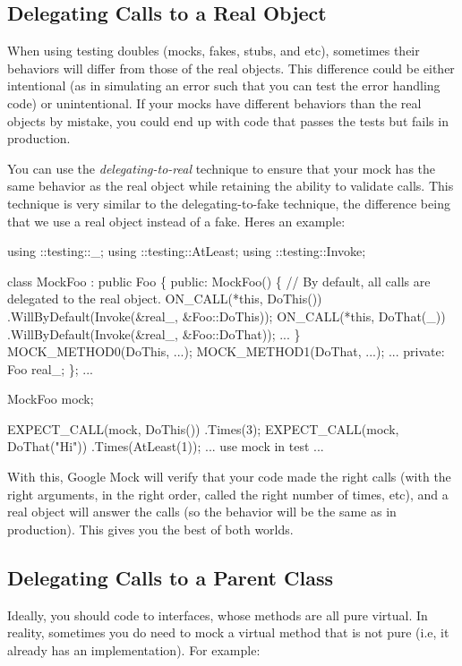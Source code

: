 \subsection*{Delegating Calls to a Real Object}

When using testing doubles (mocks, fakes, stubs, and etc), sometimes their behaviors will differ from those of the real objects. This difference could be either intentional (as in simulating an error such that you can test the error handling code) or unintentional. If your mocks have different behaviors than the real objects by mistake, you could end up with code that passes the tests but fails in production.

You can use the {\itshape delegating-\/to-\/real} technique to ensure that your mock has the same behavior as the real object while retaining the ability to validate calls. This technique is very similar to the delegating-\/to-\/fake technique, the difference being that we use a real object instead of a fake. Here\textquotesingle{}s an example\+:


\begin{DoxyCode}
using ::testing::\_;
using ::testing::AtLeast;
using ::testing::Invoke;

class MockFoo : public Foo \{
 public:
  MockFoo() \{
    // By default, all calls are delegated to the real object.
    ON\_CALL(*this, DoThis())
        .WillByDefault(Invoke(&real\_, &Foo::DoThis));
    ON\_CALL(*this, DoThat(\_))
        .WillByDefault(Invoke(&real\_, &Foo::DoThat));
    ...
  \}
  MOCK\_METHOD0(DoThis, ...);
  MOCK\_METHOD1(DoThat, ...);
  ...
 private:
  Foo real\_;
\};
...

  MockFoo mock;

  EXPECT\_CALL(mock, DoThis())
      .Times(3);
  EXPECT\_CALL(mock, DoThat("Hi"))
      .Times(AtLeast(1));
  ... use mock in test ...
\end{DoxyCode}


With this, Google Mock will verify that your code made the right calls (with the right arguments, in the right order, called the right number of times, etc), and a real object will answer the calls (so the behavior will be the same as in production). This gives you the best of both worlds.

\subsection*{Delegating Calls to a Parent Class}

Ideally, you should code to interfaces, whose methods are all pure virtual. In reality, sometimes you do need to mock a virtual method that is not pure (i.\+e, it already has an implementation). For example\+:



